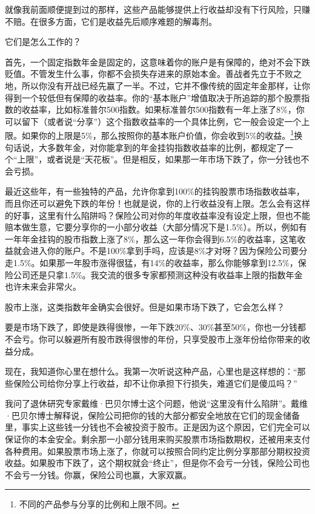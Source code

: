 就像我前面顺便提到过的那样，这些产品能够提供上行收益却没有下行风险，只赚不赔。在很多方面，它们是收益先后顺序难题的解毒剂。

它们是怎么工作的？

首先，一个固定指数年金是固定的，这意味着你的账户是有保障的，绝对不会下跌贬值。不管发生什么事，你都不会损失存进来的原始本金。善战者先立于不败之地，所以你没有开战已经先赢了一半。不过，它并不像传统的固定年金那样，让你得到一个较低但有保障的收益率。你的“基本账户”增值取决于所追踪的那个股票指数的收益率，比如标准普尔500指数。如果标准普尔500指数有一年上涨了8\%，你可以留下（或者说“分享”）这个指数收益率的一个具体比例，它一般会设定一个上限。如果你的上限是5\%，那么按照你的基本账户价值，你会收到5\%的收益。\footnote{\label{fn:pdf-29-4}不同的产品参与分享的比例和上限不同。}换句话说，大多数年金，对你能拿到的年金挂钩指数收益率的比例，都规定了一个“上限”，或者说是“天花板”。但是相反，如果那一年市场下跌了，你一分钱也不会亏损。

最近这些年，有一些独特的产品，允许你拿到100\%的挂钩股票市场指数收益率，而且你还可以避免下跌的年份！也就是说，你的上行收益没有上限。怎么会有这样的好事，这里有什么陷阱吗？保险公司对你的年度收益率没有设定上限，但也不能赔本做生意，它要分享你的一小部分收益（大部分情况下是1.5\%）。所以，例如有一年年金挂钩的股市指数上涨了8\%，那么这一年你会得到6.5\%的收益率，这笔收益就会进入你的账户。不是100\%拿到手吗，应该是8\%才对呀？因为保险公司要分走1.5\%。如果那一年股市涨得很猛，有14\%的收益率，那么你能够拿到12.5\%，保险公司还是只拿1.5\%。我交流的很多专家都预测这种没有收益率上限的指数年金也许未来会非常火。

股市上涨，这类指数年金确实会很好。但是如果市场下跌了，它会怎么样？

要是市场下跌了，即使是跌得很惨，一年下跌20\%、30\%甚至50\%，你也一分钱都不会亏。你可以躲避所有股市跌得很惨的年份，只享受股市上涨年份给你带来的收益分成。

现在，我知道你心里在想什么。我第一次听说这种产品，心里也是这样想的：“那些保险公司给你分享上行收益，却不让你承担下行损失，难道它们是傻瓜吗？”

我问了退休研究专家戴维·巴贝尔博士这个问题，他说“这里没有什么陷阱”。戴维·巴贝尔博士解释说，保险公司把你的钱的大部分都安全地放在它们的现金储备里，事实上这些钱一分钱也不会被投资于股市。正是因为这个原因，它们完全可以保证你的本金安全。剩余那一小部分钱用来购买股票市场指数期权，还被用来支付各种费用。如果股票市场上涨了，你就可以按照合同约定比例分享那部分期权投资收益。如果股市下跌了，这个期权就会“终止”，但是你不会亏一分钱，保险公司也不会亏一分钱。你赢，保险公司也赢，大家双赢。

